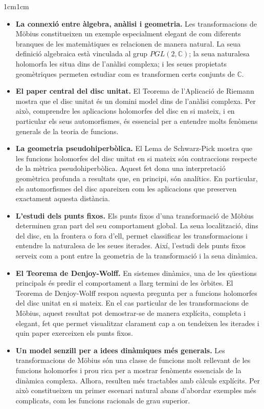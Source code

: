 \begin{adjustwidth}{1cm}{1cm}
\begin{itemize}
\item \textbf{La connexió entre àlgebra, anàlisi i geometria.} Les transformacions de Möbius constitueixen un exemple especialment elegant de com diferents branques de les matemàtiques es relacionen de manera natural. La seua definició algebraica està vinculada al grup $PGL(2,\mathbb{C})$; la seua naturalesa holomorfa les situa dins de l'anàlisi complexa; i les seues propietats geomètriques permeten estudiar com es transformen certs conjunts de $\mathbb{C}$.

\item \textbf{El paper central del disc unitat.} El Teorema de l'Aplicació de Riemann mostra que el disc unitat és un domini model dins de l'anàlisi complexa. Per això, comprendre les aplicacions holomorfes del disc en si mateix, i en particular els seus automorfismes, és essencial per a entendre molts fenòmens generals de la teoria de funcions.

\item \textbf{La geometria pseudohiperbòlica.} El Lema de Schwarz-Pick mostra que les funcions holomorfes del disc unitat en si mateix són contraccions respecte de la mètrica pseudohiperbòlica. Aquest fet dona una interpretació geomètrica profunda a resultats que, en principi, són analítics. En particular, els automorfismes del disc apareixen com les aplicacions que preserven exactament aquesta distància.

\item \textbf{L'estudi dels punts fixos.} Els punts fixos d'una transformació de Möbius determinen gran part del seu comportament global. La seua localització, dins del disc, en la frontera o fora d'ell, permet classificar les transformacions i entendre la naturalesa de les seues iterades. Així, l'estudi dels punts fixos serveix com a pont entre la geometria de la transformació i la seua dinàmica.

\item \textbf{El Teorema de Denjoy-Wolff.} En sistemes dinàmics, una de les qüestions principals és predir el comportament a llarg termini de les òrbites. El Teorema de Denjoy-Wolff respon aquesta pregunta per a funcions holomorfes del disc unitat en si mateix. En el cas particular de les transformacions de Möbius, aquest resultat pot demostrar-se de manera explícita, completa i elegant, fet que permet visualitzar clarament cap a on tendeixen les iterades i quin paper exerceixen els punts fixos.

\item \textbf{Un model senzill per a idees dinàmiques més generals.} Les transformacions de Möbius són una classe de funcions molt rellevant de les funcions holomorfes i prou rica per a mostrar fenòments essencials de la dinàmica complexa. Alhora, resulten més tractables amb càlculs explícits. Per això constitueixen un primer escenari natural abans d'abordar exemples més complicats, com les funcions racionals de grau superior.


\end{itemize}
\end{adjustwidth}
